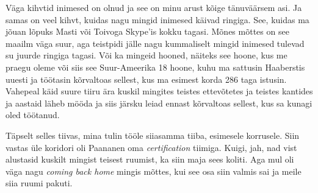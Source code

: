 Väga kihvtid inimesed on olnud ja see on minu arust kõige tänuväärsem asi. Ja 
samas on veel kihvt, kuidas nagu mingid inimesed käivad ringiga. See, kuidas ma 
jõuan lõpuks Masti või Toivoga 
Skype'is kokku tagasi. Mõnes mõttes on see maailm väga suur, aga  teistpidi 
jälle nagu kummaliselt mingid inimesed tulevad su juurde  ringiga tagasi. Või 
ka mingeid hooned, näiteks see hoone, kus me praegu oleme või siis see Suur-Ameerika 18 hoone, kuhu ma sattusin  
Haaberstis uuesti ja töötasin kõrvaltoas sellest, kus ma esimest korda  
286 taga istusin. Vahepeal käid suure tiiru ära kuskil mingites teistes ettevõtetes ja 
teistes kantides ja aastaid läheb mööda ja siis järsku leiad ennast kõrvaltoas 
sellest, kus sa kunagi oled töötanud. 


Täpselt selles tiivas, mina tulin tööle siiasamma tiiba, esimesele korrusele. 
Siin vastas üle koridori oli Paananen oma 
\emph{certification} tiimiga. Kuigi, jah, nad vist alustasid kuskilt mingist 
teisest ruumist, ka siin maja sees koliti. Aga mul oli väga nagu \emph{coming 
back home} mingis mõttes, kui see osa siin valmis sai ja meile siia ruumi 
pakuti. 